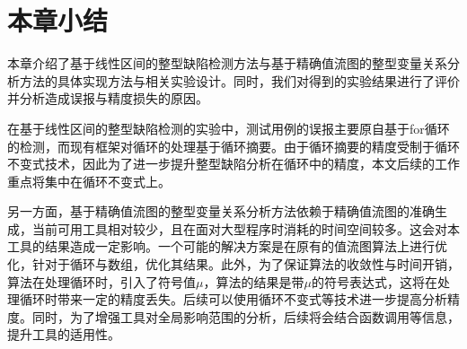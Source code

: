 \section{本章小结}

本章介绍了基于线性区间的整型缺陷检测方法与基于精确值流图的整型变量关系分析方法的具体实现方法与相关实验设计。同时，我们对得到的实验结果进行了评价并分析造成误报与精度损失的原因。

在基于线性区间的整型缺陷检测的实验中，测试用例的误报主要原自基于for循环的检测，而现有框架对循环的处理基于循环摘要。由于循环摘要的精度受制于循环不变式技术，因此为了进一步提升整型缺陷分析在循环中的精度，本文后续的工作重点将集中在循环不变式上。

另一方面，基于精确值流图的整型变量关系分析方法依赖于精确值流图的准确生成，当前可用工具相对较少，且在面对大型程序时消耗的时间空间较多。这会对本工具的结果造成一定影响。一个可能的解决方案是在原有的值流图算法上进行优化，针对于循环与数组，优化其结果。此外，为了保证算法的收敛性与时间开销，算法在处理循环时，引入了符号值$ \mu $，算法的结果是带$ \mu $的符号表达式，这将在处理循环时带来一定的精度丢失。后续可以使用循环不变式等技术进一步提高分析精度。同时，为了增强工具对全局影响范围的分析，后续将会结合函数调用等信息，提升工具的适用性。





































